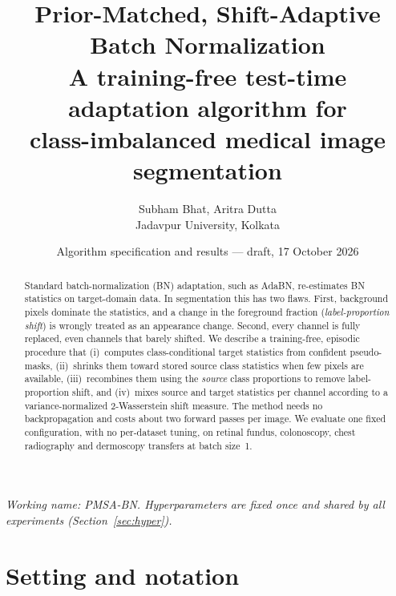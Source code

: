 \documentclass[11pt,a4paper]{article}
\title{\textbf{Prior-Matched, Shift-Adaptive Batch Normalization}\\[4pt]
\large A training-free test-time adaptation algorithm for\\ class-imbalanced medical image segmentation}
\author{Subham Bhat, Aritra Dutta\\ \small Jadavpur University, Kolkata}
\date{Algorithm specification and results --- draft, 17 October 2026}
\begin{document}
\maketitle

\begin{abstract}
\noindent Standard batch-normalization (BN) adaptation, such as AdaBN, re-estimates BN statistics on target-domain data. In segmentation this has two flaws. First, background pixels dominate the statistics, and a change in the foreground fraction (\emph{label-proportion shift}) is wrongly treated as an appearance change. Second, every channel is fully replaced, even channels that barely shifted. We describe a training-free, episodic procedure that (i)~computes class-conditional target statistics from confident pseudo-masks, (ii)~shrinks them toward stored source class statistics when few pixels are available, (iii)~recombines them using the \emph{source} class proportions to remove label-proportion shift, and (iv)~mixes source and target statistics per channel according to a variance-normalized 2-Wasserstein shift measure. The method needs no backpropagation and costs about two forward passes per image. We evaluate one fixed configuration, with no per-dataset tuning, on retinal fundus, colonoscopy, chest radiography and dermoscopy transfers at batch size~1.
\end{abstract}

\noindent\emph{Working name: PMSA-BN. Hyperparameters are fixed once and shared by all experiments (Section~\ref{sec:hyper}).}

\section{Setting and notation}
\end{document}
